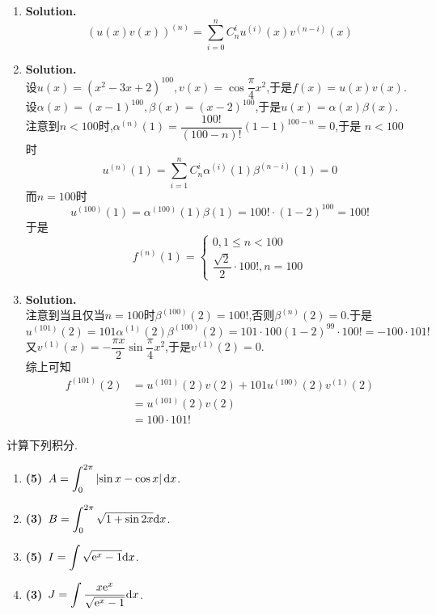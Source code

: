\documentclass{ctexart}
\begin{document}
\begin{solution}
    \begin{enumerate}[label=\textbf{(\arabic*)}]
        \item \textbf{Solution.}
            $$\left(u(x)v(x)\right)^{(n)}=\sum_{i=0}^{n}C_n^iu^{(i)}(x)v^{(n-i)}(x)$$
        \item \textbf{Solution.}\\
            设$u(x)=\left(x^2-3x+2\right)^{100},v(x)=\cos\dfrac{\pi}{4}x^2$,于是$f(x)=u(x)v(x)$.\\
            设$\alpha(x)=(x-1)^{100},\beta(x)=(x-2)^{100}$,于是$u(x)=\alpha(x)\beta(x)$.\\
            注意到$n<100$时,$\alpha^{(n)}(1)=\dfrac{100!}{(100-n)!}(1-1)^{100-n}=0$,于是
            $n<100$时$$u^{(n)}(1)=\sum_{i=1}^{n}C_n^i\alpha^{(i)}(1)\beta^{(n-i)}(1)=0$$
            而$n=100$时$$u^{(100)}(1)=\alpha^{(100)}(1)\beta(1)=100!\cdot(1-2)^{100}=100!$$
            于是$$f^{(n)}(1)=\left\{\begin{array}{l}
                0,1\leqslant n<100\\
                \dfrac{\sqrt{2}}{2}\cdot100!,n=100
            \end{array}\right.$$
        \item \textbf{Solution.}\\
            注意到当且仅当$n=100$时$\beta^{(100)}(2)=100!$,否则$\beta^{(n)}(2)=0$.于是
            $$u^{(101)}(2)=101\alpha^{(1)}(2)\beta^{(100)}(2)=101\cdot100(1-2)^{99}\cdot 100!=-100\cdot101!$$
            又$v^{(1)}(x)=-\dfrac{\pi x}{2}\sin\dfrac{\pi}{4}x^2$,于是$v^{(1)}(2)=0$.\\
            综上可知$$\begin{aligned}
                f^{(101)}(2)
                &= u^{(101)}(2)v(2)+101u^{(100)}(2)v^{(1)}(2) \\
                &= u^{(101)}(2)v(2) \\
                &= 100\cdot101!
            \end{aligned}$$
    \end{enumerate}
\end{solution}
\begin{problem}
    计算下列积分.
    \begin{enumerate}[label=\textbf{(\arabic*)}]
        \item \textbf{(5)}\ $\displaystyle A=\int_{0}^{2\pi}\left|\sin x-\cos x\right|\mathrm{d} x$.
        \item \textbf{(3)}\ $\displaystyle B=\int_{0}^{2\pi}\sqrt{1+\sin2x}\mathrm{d} x$.
        \item \textbf{(5)}\ $\displaystyle I=\int\sqrt{\mathrm{e}^x-1}\mathrm{d} x$.
        \item \textbf{(3)}\ $\displaystyle J=\int\dfrac{x\mathrm{e}^x}{\sqrt{\mathrm{e}^x-1}}\mathrm{d} x$.
    \end{enumerate}
\end{problem}
\end{document}
